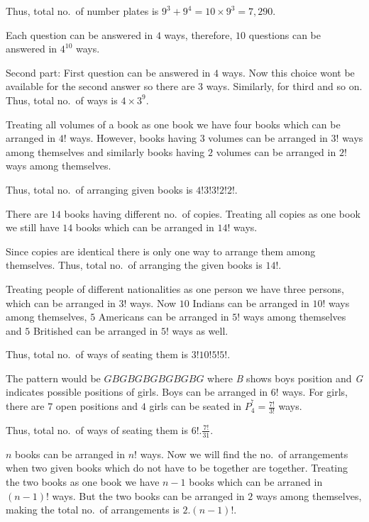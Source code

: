  Thus, total no.\ of number plates is $9^3 + 9^4 = 10\times9^3 = 7,290$.
\item Each question can be answered in $4$ ways, therefore, $10$ questions can be answered in $4^{10}$ ways.

  Second part: First question can be answered in $4$ ways. Now this choice won\symbol[rightquote]t be available for the second
  answer so there are $3$ ways. Similarly, for third and so on. Thus, total no.\ of ways is $4\times3^9$.
\item Treating all volumes of a book as one book we have four books which can be arranged in $4!$
  ways. However, books having $3$ volumes can be arranged in $3!$ ways among themselves and similarly books
  having $2$ volumes can be arranged in $2!$ ways among themselves.

  Thus, total no.\ of arranging given books is $4!3!3!2!2!$.
\item There are $14$ books having different no.\ of copies. Treating all copies as one book we still have
  $14$ books which can be arranged in $14!$ ways.

  Since copies are identical there is only one way to arrange them among themselves. Thus, total no.\ of
  arranging the given books is $14!$.
\item Treating people of different nationalities as one person we have three persons, which can be arranged
  in $3!$ ways. Now $10$ Indians can be arranged in $10!$ ways among themselves, $5$ Americans can be
  arranged in $5!$ ways among themselves and $5$ Britished can be arranged in $5!$ ways as well.

  Thus, total no.\ of ways of seating them is $3!10!5!5!$.
\item The pattern would be $GBGBGBGBGBGBG$ where {\it B} shows boys position and {\it G} indicates possible
  positions of girls. Boys can be arranged in $6!$ ways. For girls, there are $7$ open positions and $4$
  girls can be seated in $P_4^^7 = \frac{7!}{3!}$ ways.

  Thus, total no.\ of ways of seating them is $6!.\frac{7!}{31}$.
\item $n$ books can be arranged in $n!$ ways. Now we will find the no.\ of arrangements when two given books
  which do not have to be together are together. Treating the two books as one book we have $n - 1$ books
  which can be arraned in $(n - 1)!$ ways. But the two books can be arranged in $2$ ways among themselves,
  making the total no.\ of arrangements is $2.(n - 1)!$.

